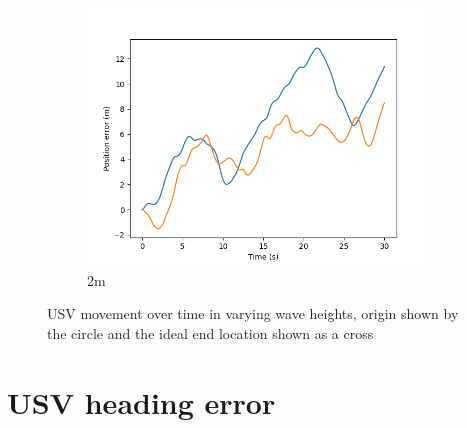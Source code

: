 \documentclass[class=article, crop=false]{standalone}
\begin{document}
\begin{figure}
\begin{subfigure}[b]{0.48\textwidth}
        \includegraphics{scenario1/rov-100m/2.0m/usv_pos_error_controlled}
        \caption{2m}
        \label{}
    \end{subfigure}
    \caption{USV movement over time in varying wave heights, origin shown by the circle and the ideal end location shown as a cross}
    \label{}
\end{figure}

\section{USV heading error}
\end{document}
